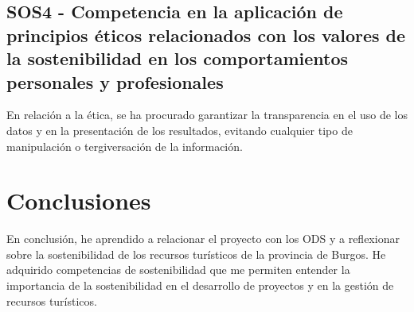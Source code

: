 \subsection{SOS4 - Competencia en la aplicación de principios éticos relacionados con los valores de la
sostenibilidad en los comportamientos personales y profesionales}

En relación a la ética, se ha procurado garantizar la transparencia en el uso de los datos y en la presentación de los resultados, evitando cualquier tipo de manipulación o tergiversación de la información.

\section{Conclusiones}

En conclusión, he aprendido a relacionar el proyecto con los ODS y a reflexionar sobre la sostenibilidad de los recursos turísticos de la provincia de Burgos.
He adquirido competencias de sostenibilidad que me permiten entender la importancia de la sostenibilidad en el desarrollo de proyectos y en la gestión de recursos turísticos.